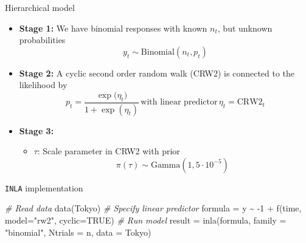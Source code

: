 \documentclass[
  ignorenonframetext,
]{beamer}
\newenvironment{Shaded}{\begin{snugshade}}{\end{snugshade}}
\newcommand{\AttributeTok}[1]{\textcolor[rgb]{0.77,0.63,0.00}{#1}}
\newcommand{\CommentTok}[1]{\textcolor[rgb]{0.56,0.35,0.01}{\textit{#1}}}
\newcommand{\ConstantTok}[1]{\textcolor[rgb]{0.00,0.00,0.00}{#1}}
\newcommand{\DecValTok}[1]{\textcolor[rgb]{0.00,0.00,0.81}{#1}}
\newcommand{\FunctionTok}[1]{\textcolor[rgb]{0.00,0.00,0.00}{#1}}
\newcommand{\NormalTok}[1]{#1}
\newcommand{\OtherTok}[1]{\textcolor[rgb]{0.56,0.35,0.01}{#1}}
\newcommand{\SpecialCharTok}[1]{\textcolor[rgb]{0.00,0.00,0.00}{#1}}
\newcommand{\StringTok}[1]{\textcolor[rgb]{0.31,0.60,0.02}{#1}}
\providecommand{\tightlist}{%
  \setlength{\itemsep}{0pt}\setlength{\parskip}{0pt}}
\begin{document}
\begin{frame}{Hierarchical model}
\protect\hypertarget{hierarchical-model}{}
\begin{itemize}
\item
  \textbf{Stage 1:} We have binomial responses with known \(n_t\), but
  unknown probabilities \[
  y_t \sim \text{Binomial}(n_t, p_t)
  \]
\item
  \textbf{Stage 2:} A cyclic second order random walk (CRW2) is
  connected to the likelihood by \[
  p_t = \frac{\exp{(\eta_t})}{1+\exp(\eta_t)}\, \text{with linear predictor}\,\eta_t = \mathrm{CRW2}_t
  \]
\item
  \textbf{Stage 3:}

  \begin{itemize}
  \tightlist
  \item
    \(\tau\): Scale parameter in CRW2 with prior \[
        \pi(\tau) \sim \text{Gamma}(1, 5\cdot 10^{-5})
    \]
  \end{itemize}
\end{itemize}
\end{frame}

\begin{frame}[fragile]{\texttt{INLA} implementation}
\protect\hypertarget{inla-implementation}{}
\begin{Shaded}
\begin{Highlighting}[]
\CommentTok{\# Read data}
\FunctionTok{data}\NormalTok{(Tokyo)}
\CommentTok{\# Specify linear predictor}
\NormalTok{formula }\OtherTok{=}\NormalTok{ y }\SpecialCharTok{\textasciitilde{}} \SpecialCharTok{{-}}\DecValTok{1} \SpecialCharTok{+} \FunctionTok{f}\NormalTok{(time, }\AttributeTok{model=}\StringTok{"rw2"}\NormalTok{, }\AttributeTok{cyclic=}\ConstantTok{TRUE}\NormalTok{)}
\CommentTok{\# Run model}
\NormalTok{result }\OtherTok{=} \FunctionTok{inla}\NormalTok{(formula,}
              \AttributeTok{family =} \StringTok{"binomial"}\NormalTok{,}
              \AttributeTok{Ntrials =}\NormalTok{ n,}
              \AttributeTok{data =}\NormalTok{ Tokyo)}
\end{Highlighting}
\end{Shaded}
\end{frame}
\end{document}
